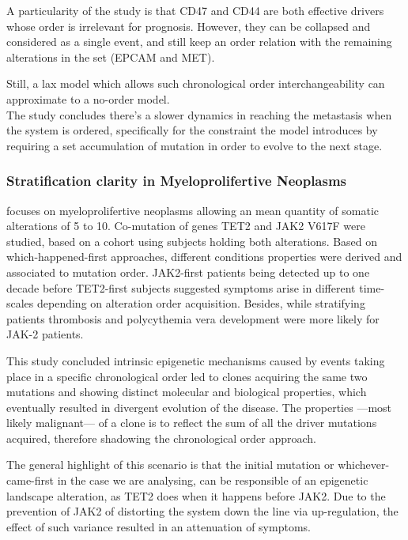A particularity of the study is that CD47 and CD44 are both effective drivers whose order is irrelevant for prognosis. However, they can be collapsed and considered as a single event, and still keep an order relation with the remaining alterations in the set (EPCAM and MET).

Still, a lax model which allows such chronological order interchangeability can approximate to a no-order model.
\\

The study concludes there's a slower dynamics in reaching the metastasis when the system is ordered, specifically for the constraint the model introduces by requiring a set accumulation of mutation in order to evolve to the next stage. 


\subsubsection{Stratification clarity in Myeloprolifertive Neoplasms}
\cite{Herbet2012AcquisitionPhenotypes} focuses on myeloprolifertive neoplasms allowing an mean quantity of somatic alterations of 5 to 10. Co-mutation of genes TET2 \cite{Delhommeau2009MutationCancers} and JAK2 V617F \cite{Levine2007JAK-2Disease} were studied, based on a cohort using subjects holding both alterations. Based on which-happened-first approaches, different conditions properties were derived and associated to mutation order. JAK2-first patients being detected up to one decade  before TET2-first subjects suggested symptoms arise in different time-scales depending on alteration order acquisition. Besides, while stratifying patients thrombosis and polycythemia vera development were more likely for JAK-2 patients.

This study concluded intrinsic epigenetic mechanisms caused by events taking place in a specific chronological order led to clones acquiring the same two mutations and showing distinct molecular and biological properties, which eventually resulted in divergent evolution of the disease. The properties —most likely malignant— of a clone is to reflect the sum of all the driver mutations acquired, therefore shadowing the chronological order approach.

The general highlight of this scenario is that the initial mutation or whichever-came-first in the case we are analysing, can be responsible of an epigenetic landscape alteration, as TET2 does when it happens before JAK2. Due to the prevention of JAK2 of distorting the system down the line via up-regulation, the effect of such variance resulted in an attenuation of symptoms.
\\


